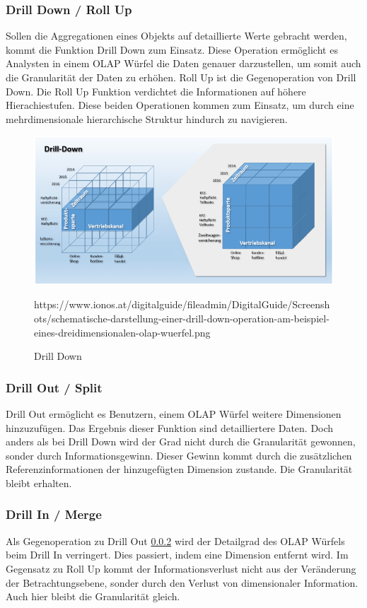 \subsubsection{Drill Down / Roll Up}\label{ssec:Drill-Down}
Sollen die Aggregationen eines Objekts auf detaillierte Werte gebracht werden, kommt die Funktion Drill Down zum Einsatz. Diese Operation ermöglicht es Analysten in einem OLAP Würfel die Daten genauer darzustellen, um somit auch die Granularität der Daten zu erhöhen. Roll Up ist die Gegenoperation von Drill Down. Die Roll Up Funktion verdichtet die Informationen auf höhere Hierachiestufen. Diese beiden Operationen kommen zum Einsatz, um durch eine mehrdimensionale hierarchische Struktur hindurch zu navigieren.
\begin{figure}[H]
\centering
  \includegraphics[scale=0.3]{images/Drill-Down.png}
  \caption[Drill Down]{Drill Down}
  {https://www.ionos.at/digitalguide/fileadmin/DigitalGuide/Screenshots/schematische-darstellung-einer-drill-down-operation-am-beispiel-eines-dreidimensionalen-olap-wuerfel.png}
  \label{fig:Drill-Down}
\end{figure}
\subsubsection{Drill Out / Split}\label{ssec:Drill-Out}
Drill Out ermöglicht es Benutzern, einem OLAP Würfel weitere Dimensionen hinzuzufügen. Das Ergebnis dieser Funktion sind detailliertere Daten. Doch anders als bei Drill Down wird der Grad nicht durch die Granularität gewonnen, sonder durch Informationsgewinn. Dieser Gewinn kommt durch die zusätzlichen Referenzinformationen der hinzugefügten Dimension zustande. Die Granularität bleibt erhalten.
\subsubsection{Drill In / Merge}\label{ssec:Drill-In}
Als Gegenoperation zu Drill Out \ref{ssec:Drill-Out} wird der Detailgrad des OLAP Würfels beim Drill In verringert. Dies passiert, indem eine Dimension entfernt wird. Im Gegensatz zu Roll Up kommt der Informationsverlust nicht aus der Veränderung der Betrachtungsebene, sonder durch den Verlust von dimensionaler Information. Auch hier bleibt die Granularität gleich. 

